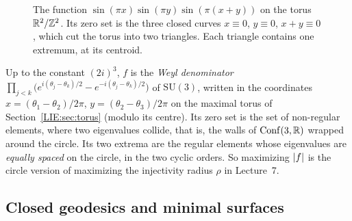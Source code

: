 \begin{figure}[ht]
\centering
{}
\caption{The function $\sin(\pi x)\sin(\pi y)\sin(\pi(x+y))$ on the torus $\mathbb{R}^2/\mathbb{Z}^2$. Its zero set is the
three closed curves $x\equiv0$, $y\equiv0$, $x+y\equiv0$, which cut the torus into two triangles. Each
triangle contains one extremum, at its centroid.}
\label{TOP:fig:torus}
\end{figure}

\begin{remark}
Up to the constant $(2i)^3$, $f$ is the \emph{Weyl denominator}
$\prod_{j<k}\big(e^{i(\theta_j-\theta_k)/2}-e^{-i(\theta_j-\theta_k)/2}\big)$ of $\mathrm{SU}(3)$, written
in the coordinates $x=(\theta_1-\theta_2)/2\pi$, $y=(\theta_2-\theta_3)/2\pi$ on the maximal torus of
Section~\ref{LIE:sec:torus} (modulo its centre). Its zero set is the set of non-regular elements, where two
eigenvalues collide, that is, the walls of $\operatorname{Conf}(3,\mathbb{R})$ wrapped around the circle. Its two extrema are
the regular elements whose eigenvalues are \emph{equally spaced} on the circle, in the two cyclic orders.
So maximizing $\left\lvert f \right\rvert$ is the circle version of maximizing the injectivity radius $\rho$ in Lecture~7.
\end{remark}

\subsection{Closed geodesics and minimal surfaces}
\label{TOP:sec:geodesics}

